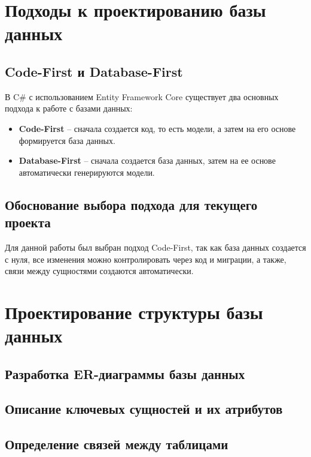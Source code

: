 \documentclass[a4paper,12pt]{report}
\begin{document}
\section{Подходы к проектированию базы данных}

\subsection{Code-First и Database-First}

В C\# с использованием Entity Framework Core существует два основных подхода к работе с базами данных:
\begin{itemize}
    \item
        \textbf{Code-First} -- сначала создается код, то есть модели, а затем на его основе формируется база данных.
    \item
        \textbf{Database-First} -- сначала создается база данных, затем на ее основе автоматически генерируются модели.
\end{itemize}

\subsection{Обоснование выбора подхода для текущего проекта}

Для данной работы был выбран подход Code-First, так как база данных создается с нуля, все изменения можно контролировать через код и миграции,
а также, связи между сущностями создаются автоматически.

\section{Проектирование структуры базы данных}

\subsection{Разработка ER-диаграммы базы данных}

\subsection{Описание ключевых сущностей и их атрибутов}

\subsection{Определение связей между таблицами}

\end{document}
